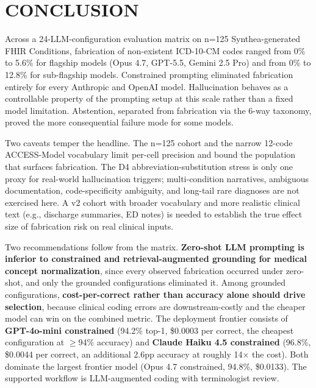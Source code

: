 \section{CONCLUSION}\label{conclusion}

Across a 24-LLM-configuration evaluation matrix on n=125
Synthea-generated FHIR Conditions, fabrication of non-existent
ICD-10-CM codes ranged from 0\% to 5.6\% for flagship models (Opus
4.7, GPT-5.5, Gemini 2.5 Pro) and from 0\% to 12.8\% for sub-flagship
models. Constrained prompting eliminated fabrication entirely for
every Anthropic and OpenAI model. Hallucination behaves as a
controllable property of the prompting setup at this scale rather
than a fixed model limitation. Abstention, separated from
fabrication via the 6-way taxonomy, proved the more consequential
failure mode for some models.

Two caveats temper the headline. The n=125 cohort and the narrow
12-code ACCESS-Model vocabulary limit per-cell precision and bound
the population that surfaces fabrication. The D4
abbreviation-substitution stress is only one proxy for real-world
hallucination triggers; multi-condition narratives, ambiguous
documentation, code-specificity ambiguity, and long-tail rare
diagnoses are not exercised here. A v2 cohort with broader
vocabulary and more realistic clinical text (e.g., discharge
summaries, ED notes) is needed to establish the true effect size
of fabrication risk on real clinical inputs.

Two recommendations follow from the matrix. \textbf{Zero-shot LLM prompting
is inferior to constrained and retrieval-augmented grounding for
medical concept normalization}, since every observed fabrication
occurred under zero-shot, and only the grounded configurations
eliminated it. Among
grounded configurations, \textbf{cost-per-correct rather than accuracy
alone should drive selection}, because clinical coding errors are
downstream-costly and the cheaper model can win on the combined
metric. The deployment frontier consists of \textbf{GPT-4o-mini
constrained} (94.2\% top-1, \$0.0003 per correct, the cheapest
configuration at $\geq$94\% accuracy) and \textbf{Claude Haiku 4.5
constrained} (96.8\%, \$0.0044 per correct, an additional 2.6pp
accuracy at roughly 14× the cost). Both dominate the largest
frontier model (Opus 4.7 constrained, 94.8\%, \$0.0133). The
supported workflow is LLM-augmented coding with terminologist
review.
